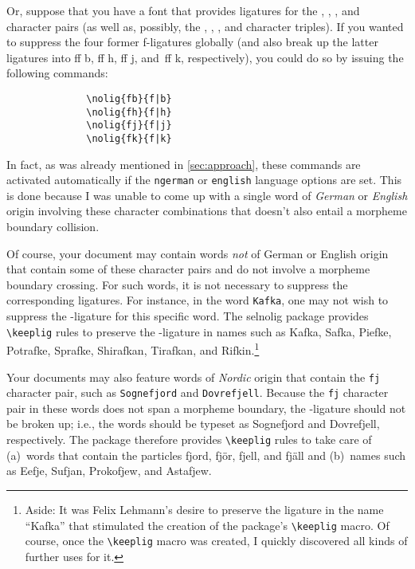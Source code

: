 \documentclass[11pt]{article}
\newcommand{\pkg}[1]{\textsf{#1}}
\newcommand{\opt}[1]{\texttt{#1}}
\newcommand{\cmmd}[1]{\texttt{\textbackslash #1}}
\begin{document}

Or, suppose that you have a font that provides ligatures for the {\ebg {}, , ,} and {\ebg{}} character pairs (as well as, possibly, the {\ebg {}, , ,} and {\ebg{}} character triples). If you wanted to suppress the four former f-ligatures globally (and also break up the latter ligatures into ff\kern0pt b, ff\kern0pt h, ff\kern0pt j, and~ff\kern0pt k, respectively), you could do so by issuing the following commands: 
\begin{Verbatim}
              \nolig{fb}{f|b}
              \nolig{fh}{f|h}
              \nolig{fj}{f|j}
              \nolig{fk}{f|k}
\end{Verbatim}
In fact, as was already mentioned in \cref{sec:approach}, these commands are activated automatically if the \opt{ngerman} or \opt{english} language options are set. This is done because I was unable to come up with a single word of \emph{German} or \emph{English} origin involving these character combinations that doesn't also entail a morpheme boundary collision.

Of course, your document may contain words \emph{not} of German or English origin that contain some of these character pairs and do not involve a morpheme boundary crossing. For such words, it is not necessary to suppress the corresponding ligatures. For instance, in the word \opt{Kafka}, one may not wish to suppress the {\ebg{}}-ligature for this specific word. The \pkg{selnolig} package provides \cmmd{keeplig} rules to preserve the {\ebg{}}-ligature in names such as {\ebg Kafka, Safka, Piefke, Potrafke, Sprafke, Shirafkan, Tirafkan}, and {\ebg Rifkin}.\footnote{Aside: It was Felix Lehmann's desire to preserve the {\ebg{}} ligature in the name \enquote{{\ebg Kafka}} that stimulated the creation of the package's \cmmd{keeplig} macro. Of course, once the \cmmd{keeplig} macro was created, I quickly discovered all kinds of further uses for it.} 

Your documents may also feature words of \emph{Nordic} origin that contain the \opt{fj} character pair, such as \opt{Sognefjord} and \opt{Dovrefjell}. Because the \opt{fj} character pair in these words does not span a morpheme boundary, the {\ebg{}}-ligature should not be broken up; i.e., the words should be typeset as {\ebg Sognefjord} and {\ebg Dovrefjell}, respectively. The package therefore provides \cmmd{keeplig} rules to take care of (a)~words that contain the particles {\ebg fjord, fjör, fjell}, and {\ebg fjäll} and (b)~names such as {\ebg Eefje, Sufjan, Prokofjew}, and {\ebg Astafjew}.
\end{document}
